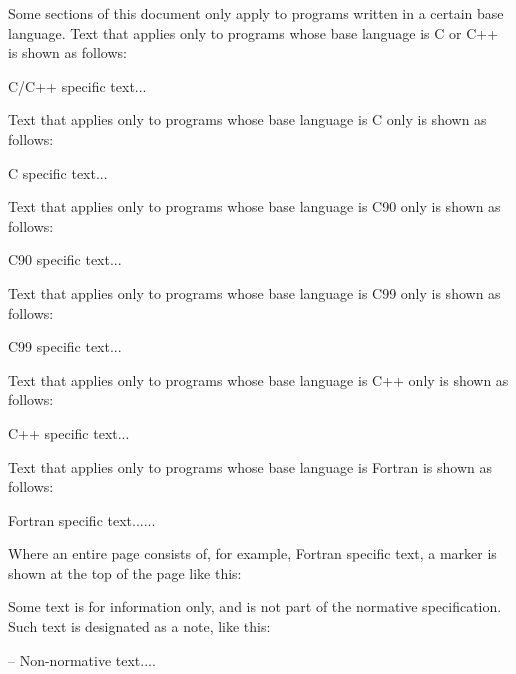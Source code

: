 Some sections of this document only apply to programs written in a certain base 
language. Text that applies only to programs whose base language is C or C++ is shown 
as follows: 

\ccppspecificstart
C/C++ specific text...
\ccppspecificend

Text that applies only to programs whose base language is C only is shown as follows:

\cspecificstart
C specific text...
\cspecificend

Text that applies only to programs whose base language is C90 only is shown as 
follows:

\cNinetyspecificstart
C90 specific text...
\cNinetyspecificend

Text that applies only to programs whose base language is C99 only is shown as 
follows:

\cNinetyNinespecificstart
C99 specific text...
\cNinetyNinespecificend

Text that applies only to programs whose base language is C++ only is shown as 
follows:

\cppspecificstart
C++ specific text...
\cppspecificend

Text that applies only to programs whose base language is Fortran is shown as follows: 

\fortranspecificstart
Fortran specific text......
\fortranspecificend

Where an entire page consists of, for example, Fortran specific text, a marker is shown 
at the top of the page like this:

\bigskip
{}
\bigskip

Some text is for information only, and is not part of the normative specification. Such 
text is designated as a note, like this: 

\notestart
\noteheader – Non-normative text....
\noteend



